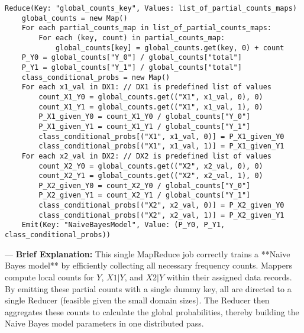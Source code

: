 \documentclass{article}
\begin{document}
\begin{enumerate}[label=\textbf{Question \arabic*.}]
\begin{enumerate}[label=(\alph*)]
        \begin{lstlisting}
Reduce(Key: "global_counts_key", Values: list_of_partial_counts_maps)
    global_counts = new Map()
    For each partial_counts_map in list_of_partial_counts_maps:
        For each (key, count) in partial_counts_map:
            global_counts[key] = global_counts.get(key, 0) + count
    P_Y0 = global_counts["Y_0"] / global_counts["total"]
    P_Y1 = global_counts["Y_1"] / global_counts["total"]
    class_conditional_probs = new Map()
    For each x1_val in DX1: // DX1 is predefined list of values
        count_X1_Y0 = global_counts.get(("X1", x1_val, 0), 0)
        count_X1_Y1 = global_counts.get(("X1", x1_val, 1), 0)
        P_X1_given_Y0 = count_X1_Y0 / global_counts["Y_0"]
        P_X1_given_Y1 = count_X1_Y1 / global_counts["Y_1"]
        class_conditional_probs[("X1", x1_val, 0)] = P_X1_given_Y0
        class_conditional_probs[("X1", x1_val, 1)] = P_X1_given_Y1
    For each x2_val in DX2: // DX2 is predefined list of values
        count_X2_Y0 = global_counts.get(("X2", x2_val, 0), 0)
        count_X2_Y1 = global_counts.get(("X2", x2_val, 1), 0)
        P_X2_given_Y0 = count_X2_Y0 / global_counts["Y_0"]
        P_X2_given_Y1 = count_X2_Y1 / global_counts["Y_1"]
        class_conditional_probs[("X2", x2_val, 0)] = P_X2_given_Y0
        class_conditional_probs[("X2", x2_val, 1)] = P_X2_given_Y1
    Emit(Key: "NaiveBayesModel", Value: (P_Y0, P_Y1, class_conditional_probs))
        \end{lstlisting}
    \end{enumerate}
    ---
    \textbf{Brief Explanation:} This single MapReduce job correctly trains a **Naive Bayes model** by efficiently collecting all necessary frequency counts. Mappers compute local counts for $Y$, $X1|Y$, and $X2|Y$ within their assigned data records. By emitting these partial counts with a single dummy key, all are directed to a single Reducer (feasible given the small domain sizes). The Reducer then aggregates these counts to calculate the global probabilities, thereby building the Naive Bayes model parameters in one distributed pass.

\end{enumerate}
\end{document}
